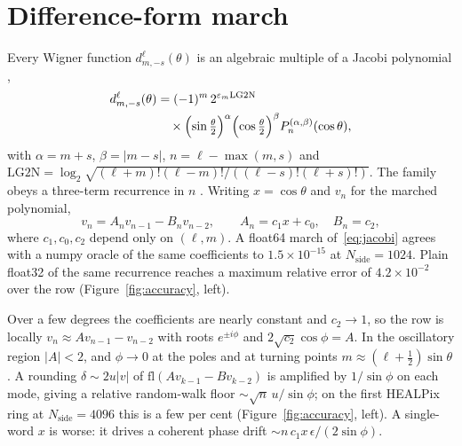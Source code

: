 \documentclass[letters,usenatbib,useAMS]{mnras}
\begin{document}
\section{Difference-form march}

Every Wigner function $d^\ell_{m,-s}(\theta)$ is an algebraic multiple of a Jacobi polynomial \citep[NIST DLMF 14.9.16, 18.3]{olver2010},
\begin{equation}
\begin{split}
  d^\ell_{m,-s}(\theta)
  &= (-1)^m\,2^{\varepsilon_m\mathrm{LG2N}}\\
  &\quad\times
    \Bigl(\sin\tfrac{\theta}{2}\Bigr)^\alpha
    \Bigl(\cos\tfrac{\theta}{2}\Bigr)^\beta
    P_n^{(\alpha,\beta)}(\cos\theta),
\end{split}
\end{equation}
with $\alpha=m+s$, $\beta=\lvert m-s\rvert$, $n=\ell-\max(m,s)$ and $\mathrm{LG2N}=\log_2\sqrt{(\ell+m)!(\ell-m)!/((\ell-s)!(\ell+s)!)}$. The family obeys a three-term recurrence in $n$ \citep[DLMF 18.9.1]{olver2010}. Writing $x=\cos\theta$ and $v_n$ for the marched polynomial,
\begin{equation}
\label{eq:jacobi}
  v_n = A_n v_{n-1}-B_n v_{n-2},\qquad A_n=c_1 x+c_0,\quad B_n=c_2,
\end{equation}
where $c_1,c_0,c_2$ depend only on $(\ell,m)$. A float64 march of~\eqref{eq:jacobi} agrees with a numpy oracle of the same coefficients to $1.5\times10^{-15}$ at $N_{\mathrm{side}}=1024$. Plain float32 of the same recurrence reaches a maximum relative error of $4.2\times10^{-2}$ over the row (Figure~\ref{fig:accuracy}, left).

Over a few degrees the coefficients are nearly constant and $c_2\to1$, so the row is locally $v_n\approx A v_{n-1}-v_{n-2}$ with roots $e^{\pm i\phi}$ and $2\sqrt{c_2}\cos\phi=A$. In the oscillatory region $\lvert A\rvert<2$, and $\phi\to0$ at the poles and at turning points $m\approx(\ell+\tfrac12)\sin\theta$. A rounding $\delta\sim 2u\lvert v\rvert$ of $\mathrm{fl}(Av_{k-1}-Bv_{k-2})$ is amplified by $1/\sin\phi$ on each mode, giving a relative random-walk floor $\sim\sqrt{n}\,u/\sin\phi$; on the first HEALPix ring at $N_{\mathrm{side}}=4096$ this is a few per cent (Figure~\ref{fig:accuracy}, left). A single-word $x$ is worse: it drives a coherent phase drift $\sim n\,c_1x\,\epsilon/(2\sin\phi)$.
\end{document}
